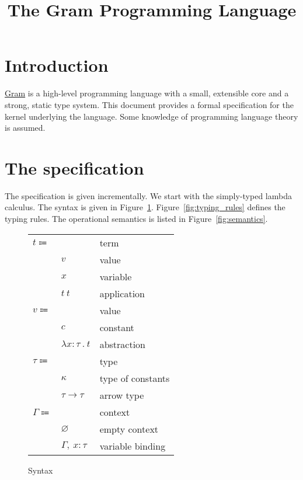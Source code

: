 \documentclass[12pt]{article}
\author{}
\date{}
\title{The Gram Programming Language}
\newcommand\eterm{t}
\newcommand\evalue{v}
\newcommand\econst{c}
\newcommand\evar{x}
\newcommand\eabs[2]{\lambda #1 \ . \ #2}
\newcommand\eapp[2]{#1 \ #2}
\newcommand\ttype{\tau}
\newcommand\tconst{\kappa}
\newcommand\tarrow[2]{#1 \rightarrow #2}
\newcommand\hastype[2]{#1 : #2}
\newcommand\ccontext{\Gamma}
\newcommand\cempty{\varnothing}
\newcommand\cextend[3]{#1, \ \hastype{#2}{#3}}
\begin{document}
  \maketitle

  \section*{Introduction}

  \href{https://www.gram.org/}{Gram} is a high-level programming language with a small, extensible core and a strong, static type system. This document provides a formal specification for the kernel underlying the language. Some knowledge of programming language theory is assumed.

  \section*{The specification}

  The specification is given incrementally. We start with the simply-typed lambda calculus. The syntax is given in Figure~\ref{fig:syntax}. Figure~\ref{fig:typing_rules} defines the typing rules. The operational semantics is listed in Figure~\ref{fig:semantics}.

  \begin{figure}
    \begin{mdframed}
      \begin{center}
        \begin{tabular}{l l l}
          $\eterm \Coloneqq $ & & term \\
          & $\evalue$ & value \\
          & $\evar$ & variable \\
          & $\eapp{\eterm}{\eterm}$ & application \\
          $\evalue \Coloneqq $ & & value \\
          & $\econst$ & constant \\
          & $\eabs{\hastype{\evar}{\ttype}}{\eterm}$ & abstraction \\
          $\ttype \Coloneqq$ & & type \\
          & $\tconst$ & type of constants \\
          & $\tarrow{\ttype}{\ttype}$ & arrow type \\
          $\ccontext \Coloneqq$ & & context \\
          & $\cempty$ & empty context \\
          & $\cextend{\ccontext}{\evar}{\ttype}$ & variable binding \\
        \end{tabular}
      \end{center}

      \caption{Syntax}
      \label{fig:syntax}
    \end{mdframed}
  \end{figure}
\end{document}
